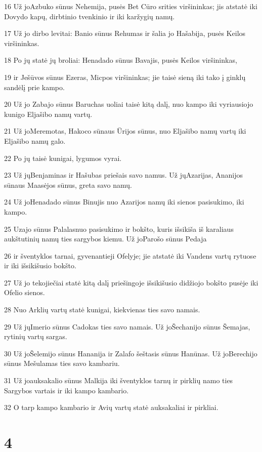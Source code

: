 \par 16 Už jo­Azbuko sūnus Nehemija, pusės Bet Cūro srities viršininkas; jis atstatė iki Dovydo kapų, dirbtinio tvenkinio ir iki karžygių namų. 
\par 17 Už jo dirbo levitai: Banio sūnus Rehumas ir šalia jo Hašabija, pusės Keilos viršininkas. 
\par 18 Po jų statė jų broliai: Henadado sūnus Bavajis, pusės Keilos viršininkas, 
\par 19 ir Ješūvos sūnus Ezeras, Micpos viršininkas; jie taisė sieną iki tako į ginklų sandėlį prie kampo. 
\par 20 Už jo Zabajo sūnus Baruchas uoliai taisė kitą dalį, nuo kampo iki vyriausiojo kunigo Eljašibo namų vartų. 
\par 21 Už jo­Meremotas, Hakoco sūnaus Ūrijos sūnus, nuo Eljašibo namų vartų iki Eljašibo namų galo. 
\par 22 Po jų taisė kunigai, lygumos vyrai. 
\par 23 Už jų­Benjaminas ir Hašubas priešais savo namus. Už jų­Azarijas, Ananijos sūnaus Maasėjos sūnus, greta savo namų. 
\par 24 Už jo­Henadado sūnus Binujis nuo Azarijos namų iki sienos pasisukimo, iki kampo. 
\par 25 Uzajo sūnus Palalas­nuo pasisukimo ir bokšto, kuris išsikiša iš karaliaus aukštutinių namų ties sargybos kiemu. Už jo­Parošo sūnus Pedaja 
\par 26 ir šventyklos tarnai, gyvenantieji Ofelyje; jie atstatė iki Vandens vartų rytuose ir iki išsikišusio bokšto. 
\par 27 Už jo tekojiečiai statė kitą dalį priešingoje išsikišusio didžiojo bokšto pusėje iki Ofelio sienos. 
\par 28 Nuo Arklių vartų statė kunigai, kiekvienas ties savo namais. 
\par 29 Už jų­Imerio sūnus Cadokas ties savo namais. Už jo­Šechanijo sūnus Šemajas, rytinių vartų sargas. 
\par 30 Už jo­Šelemijo sūnus Hananija ir Zalafo šeštasis sūnus Hanūnas. Už jo­Berechijo sūnus Mešulamas ties savo kambariu. 
\par 31 Už jo­auksakalio sūnus Malkija iki šventyklos tarnų ir pirklių namo ties Sargybos vartais ir iki kampo kambario. 
\par 32 O tarp kampo kambario ir Avių vartų statė auksakaliai ir pirkliai.



\chapter{4}

